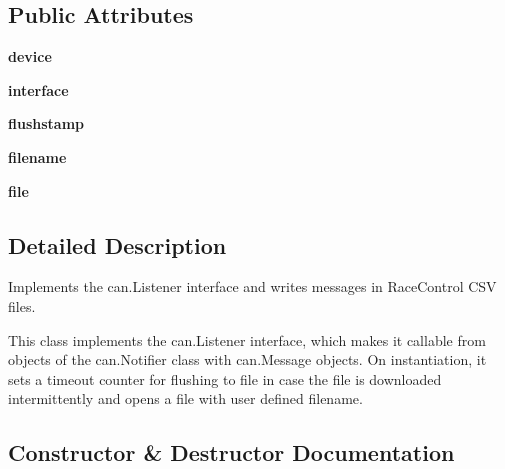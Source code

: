 \subsection*{Public Attributes}
\begin{DoxyCompactItemize}
\item 
{\bfseries device}\hypertarget{classracecontrol_1_1logcom_1_1CSVLogger_a95f52b7ee93b7cffe3e90573f471445d}{}\label{classracecontrol_1_1logcom_1_1CSVLogger_a95f52b7ee93b7cffe3e90573f471445d}

\item 
{\bfseries interface}\hypertarget{classracecontrol_1_1logcom_1_1CSVLogger_a7699efcb2269db009a16a1d0480d69a6}{}\label{classracecontrol_1_1logcom_1_1CSVLogger_a7699efcb2269db009a16a1d0480d69a6}

\item 
{\bfseries flushstamp}\hypertarget{classracecontrol_1_1logcom_1_1CSVLogger_a30078c3a214fefa381fcfccfbe4a3681}{}\label{classracecontrol_1_1logcom_1_1CSVLogger_a30078c3a214fefa381fcfccfbe4a3681}

\item 
{\bfseries filename}\hypertarget{classracecontrol_1_1logcom_1_1CSVLogger_a1224e8bf10827b6a7be2cc8ff4d60b35}{}\label{classracecontrol_1_1logcom_1_1CSVLogger_a1224e8bf10827b6a7be2cc8ff4d60b35}

\item 
{\bfseries file}\hypertarget{classracecontrol_1_1logcom_1_1CSVLogger_a7673704993c47cf5adc04ff49512c1f0}{}\label{classracecontrol_1_1logcom_1_1CSVLogger_a7673704993c47cf5adc04ff49512c1f0}

\end{DoxyCompactItemize}


\subsection{Detailed Description}
\begin{DoxyVerb}Implements the can.Listener interface and writes messages in RaceControl
CSV files.

This class implements the can.Listener interface, which makes it callable
from objects of the can.Notifier class with can.Message objects. On
instantiation, it sets a timeout counter for flushing to file in case the
file is downloaded intermittently and opens a file with user defined
filename.
\end{DoxyVerb}
 

\subsection{Constructor \& Destructor Documentation}
